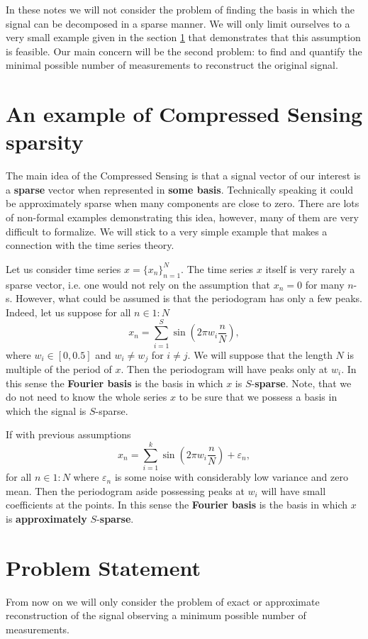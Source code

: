 \documentclass[11pt]{article}
\numberwithin{equation}{section}
\theoremstyle{definition}
\begin{document}
In these notes we will not consider the problem of finding the basis in which the signal can be decomposed in a sparse manner.
We will only limit ourselves to a very small example given in the section \ref{sec:motivation} that demonstrates that this assumption is feasible.
Our main concern will be the second problem: to find and quantify the minimal possible number of measurements to reconstruct the original signal.

\section{An example of Compressed Sensing sparsity}
\label{sec:motivation}
The main idea of the Compressed Sensing is that a signal vector of our interest is a \textbf{sparse} vector when represented in \textbf{some basis}.
Technically speaking it could be approximately sparse when many components are close to zero.
There are lots of non-formal examples demonstrating this idea, however, many of them are very difficult to formalize.
We will stick to a very simple example that makes a connection with the time series theory.

Let us consider time series $x = \{x_n\}_{n=1}^N$.
The time series $x$ itself is very rarely a sparse vector, i.e. one would not rely on the assumption that $x_n = 0$ for many $n$-s.
However, what could be assumed is that the periodogram has only a few peaks.
Indeed, let us suppose for all $n \in 1:N$
$$ x_n = \sum_{i=1}^S \sin\left(2 \pi w_i \frac{n}{N}\right), $$
where $w_i \in [0, 0.5]$ and $w_i \neq w_j$ for $i \neq j$.
We will suppose that the length $N$ is multiple of the period of $x$.
Then the periodogram will have peaks only at $w_i$.
In this sense the \textbf{Fourier basis} is the basis in which $x$ is $S$-\textbf{sparse}.
Note, that we do not need to know the whole series $x$ to be sure that we possess a basis in which the signal is $S$-sparse.

If with previous assumptions 
$$ x_n = \sum_{i=1}^k \sin\left(2 \pi w_i \frac{n}{N}\right) + \varepsilon_n, $$
for all $n \in 1:N$
where $\varepsilon_n$ is some noise with considerably low variance and zero mean.
Then the periodogram aside possessing peaks at $w_i$ will have small coefficients at the points.
In this sense the \textbf{Fourier basis} is the basis in which $x$ is \textbf{approximately} $S$-\textbf{sparse}.

\section{Problem Statement}
From now on we will only consider the problem of exact or approximate reconstruction of the signal observing a minimum possible number of measurements.
\end{document}
